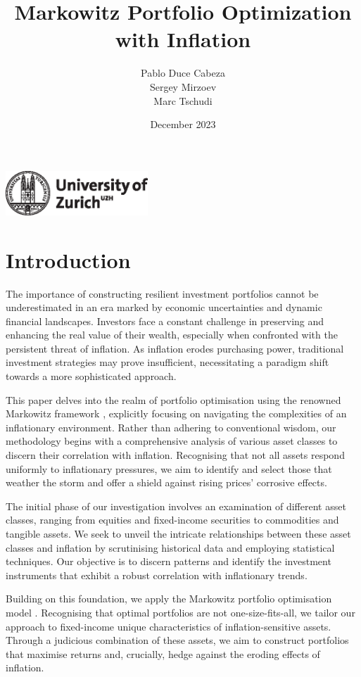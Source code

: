 \documentclass{article}
\title{Markowitz Portfolio Optimization with Inflation}
\author{Pablo Duce Cabeza \\ Sergey Mirzoev \\ Marc Tschudi}
\date{December 2023}
\makeatletter
\renewcommand{\maketitle}{
    \begin{titlepage}
        \vspace*{\stretch{1}}
        \begin{center}
            \Large\textbf{\@title}
        \end{center}
        \vspace{\stretch{2}}
        \begin{center}
            \large\@author
        \end{center}
        \vspace{\stretch{3}}
        \begin{center}
            \large\@date
        \end{center}
        \vspace{\stretch{0.5}}
        \begin{center}
            \includegraphics[width=0.4\textwidth]{figure/uzh_logo_e_pos.eps}
        \end{center}
    \end{titlepage}
}
\makeatother
\begin{document}
\maketitle

\newpage
\tableofcontents
\newpage
\listoffigures
\listoftables
\newpage

\section{Introduction}

The importance of constructing resilient investment portfolios cannot be underestimated in an era marked by economic uncertainties and dynamic financial landscapes. Investors face a constant challenge in preserving and enhancing the real value of their wealth, especially when confronted with the persistent threat of inflation. As inflation erodes purchasing power, traditional investment strategies may prove insufficient, necessitating a paradigm shift towards a more sophisticated approach.

This paper delves into the realm of portfolio optimisation using the renowned Markowitz framework \cite{markowitz1952}, explicitly focusing on navigating the complexities of an inflationary environment. Rather than adhering to conventional wisdom, our methodology begins with a comprehensive analysis of various asset classes to discern their correlation with inflation. Recognising that not all assets respond uniformly to inflationary pressures, we aim to identify and select those that weather the storm and offer a shield against rising prices' corrosive effects.

The initial phase of our investigation involves an examination of different asset classes, ranging from equities and fixed-income securities to commodities and tangible assets. We seek to unveil the intricate relationships between these asset classes and inflation by scrutinising historical data and employing statistical techniques. Our objective is to discern patterns and identify the investment instruments that exhibit a robust correlation with inflationary trends.

Building on this foundation, we apply the Markowitz portfolio optimisation model \cite{markowitz1952}. Recognising that optimal portfolios are not one-size-fits-all, we tailor our approach to fixed-income unique characteristics of inflation-sensitive assets. Through a judicious combination of these assets, we aim to construct portfolios that maximise returns and, crucially, hedge against the eroding effects of inflation.
\end{document}
